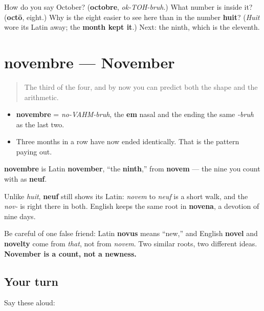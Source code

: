 \begin{tcolorbox}[breakable,colback=teal!4,colframe=teal!35!black,title={Before you move on}]
How do you say October? (\textbf{octobre}, \emph{ok-TOH-bruh}.) What number is inside it? (\textbf{octō}, eight.) Why is the eight easier to see here than in the number \textbf{huit}? (\emph{Huit} wore its Latin away; the \textbf{month kept it}.) Next: the ninth, which is the eleventh.
\end{tcolorbox}
\section[novembre]{novembre — November}

\label{lesson:FR-C09-novembre}



\begin{quote}
The third of the four, and by now you can predict both the shape and the arithmetic.
\end{quote}

\begin{sounds}
\begin{itemize}
\raggedright
  \item \textbf{novembre} = \emph{no-VAHM-bruh}, the \textbf{em} nasal and the ending the same \emph{-bruh} as the last two.
  \item Three months in a row have now ended identically. That is the pattern paying out.
\end{itemize}
\end{sounds}

\begin{cousinweb}
\textbf{novembre} is Latin \textbf{november}, \textquotedblleft{}the \textbf{ninth},\textquotedblright{} from \textbf{novem} — the nine you count with as \textbf{neuf}.

Unlike \emph{huit}, \textbf{neuf} still shows its Latin: \emph{novem} to \emph{neuf} is a short walk, and the \emph{nov-} is right there in both. English keeps the same root in \textbf{novena}, a devotion of nine days.

Be careful of one false friend: Latin \textbf{novus} means \textquotedblleft{}new,\textquotedblright{} and English \textbf{novel} and \textbf{novelty} come from \emph{that}, not from \emph{novem}. Two similar roots, two different ideas. \textbf{November is a count, not a newness.}
\end{cousinweb}

\subsection*{Your turn}
Say these aloud:

